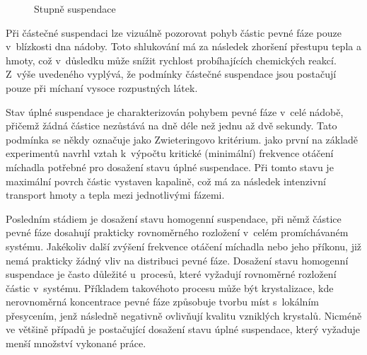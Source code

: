 \begin{figure}[h!]
  \qquad
  \caption{Stupně suspendace}
  \label{fig:typsus}
\end{figure}

Při částečné suspendaci lze vizuálně pozorovat pohyb částic pevné fáze pouze v~blíz\-kos\-ti dna nádoby. Toto shlukování má za následek zhoršení přestupu tepla a hmoty, což v~důsledku může snížit rychlost probíhajících chemických reakcí. Z~výše uvedeného vyplývá, že podmínky částečné suspendace jsou postačují pouze při míchaní vysoce rozpustných látek.

Stav úplné suspendace je charakterizován pohybem pevné fáze v~celé nádobě, přičemž žádná částice nezůstává na dně déle než jednu až dvě sekundy. Tato podmínka se někdy označuje jako Zwieteringovo kritérium. \citet{zwi58} jako první na základě experimentů navrhl vztah k~výpočtu kritické (minimální) frekvence otáčení míchadla potřebné pro dosažení stavu úplné suspendace. Při tomto stavu je maximální povrch částic vystaven kapalině, což má za následek intenzivní transport hmoty a tepla mezi jednotlivými fázemi.

Posledním stádiem je dosažení stavu homogenní suspendace, při němž částice pevné fáze dosahují prakticky rovnoměrného rozložení v~celém promíchávaném systému. Ja\-ké\-ko\-liv další zvýšení frekvence otáčení míchadla nebo jeho příkonu, již nemá prakticky žádný vliv na distribuci pevné fáze. Dosažení stavu homogenní suspendace je často důležité u~procesů, které vyžadují rovnoměrné rozložení částic v~systému. Příkladem takovéhoto procesu může být krystalizace, kde nerovnoměrná koncentrace pevné fáze způsobuje tvorbu míst s~lokálním přesycením, jenž následně negativně ovlivňují kvalitu vzniklých krystalů. Nicméně ve většině případů je postačující dosažení stavu úplné suspendace, který vyžaduje menší množství vykonané práce.

